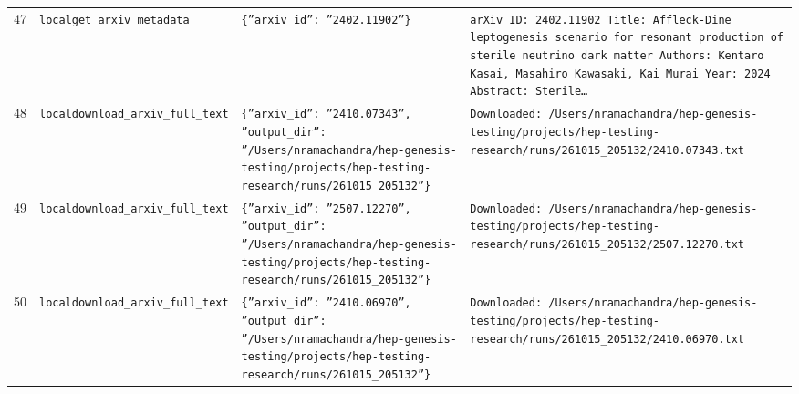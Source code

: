 \documentclass[11pt,a4paper]{article}
\begin{document}
\begin{longtable}{@{}p{}p{}p{}p{}@{}}
47 & \texttt{local}\newline\texttt{get\_\allowbreak{}arxiv\_\allowbreak{}metadata} & \texttt{\{''arxiv\_\allowbreak{}id'':\allowbreak{} ''2402.11902''\}\allowbreak{}} & \texttt{arXiv ID:\allowbreak{} 2402.11902 Title:\allowbreak{} Affleck-Dine leptogenesis scenario for resonant production of sterile neutrino dark matter Authors:\allowbreak{} Kentaro Kasai,\allowbreak{} Masahiro Kawasaki,\allowbreak{} Kai Murai Year:\allowbreak{} 2024 Abstract:\allowbreak{} Sterile\ldots{}\allowbreak{}} \\
48 & \texttt{local}\newline\texttt{download\_\allowbreak{}arxiv\_\allowbreak{}full\_\allowbreak{}text} & \texttt{\{''arxiv\_\allowbreak{}id'':\allowbreak{} ''2410.07343'',\allowbreak{} ''output\_\allowbreak{}dir'':\allowbreak{} ''/\allowbreak{}Users/\allowbreak{}nramachandra/\allowbreak{}hep-genesis-testing/\allowbreak{}projects/\allowbreak{}hep-testing-research/\allowbreak{}runs/\allowbreak{}261015\_\allowbreak{}205132''\}\allowbreak{}} & \texttt{Downloaded:\allowbreak{} /\allowbreak{}Users/\allowbreak{}nramachandra/\allowbreak{}hep-genesis-testing/\allowbreak{}projects/\allowbreak{}hep-testing-research/\allowbreak{}runs/\allowbreak{}261015\_\allowbreak{}205132/\allowbreak{}2410.07343.txt} \\
49 & \texttt{local}\newline\texttt{download\_\allowbreak{}arxiv\_\allowbreak{}full\_\allowbreak{}text} & \texttt{\{''arxiv\_\allowbreak{}id'':\allowbreak{} ''2507.12270'',\allowbreak{} ''output\_\allowbreak{}dir'':\allowbreak{} ''/\allowbreak{}Users/\allowbreak{}nramachandra/\allowbreak{}hep-genesis-testing/\allowbreak{}projects/\allowbreak{}hep-testing-research/\allowbreak{}runs/\allowbreak{}261015\_\allowbreak{}205132''\}\allowbreak{}} & \texttt{Downloaded:\allowbreak{} /\allowbreak{}Users/\allowbreak{}nramachandra/\allowbreak{}hep-genesis-testing/\allowbreak{}projects/\allowbreak{}hep-testing-research/\allowbreak{}runs/\allowbreak{}261015\_\allowbreak{}205132/\allowbreak{}2507.12270.txt} \\
50 & \texttt{local}\newline\texttt{download\_\allowbreak{}arxiv\_\allowbreak{}full\_\allowbreak{}text} & \texttt{\{''arxiv\_\allowbreak{}id'':\allowbreak{} ''2410.06970'',\allowbreak{} ''output\_\allowbreak{}dir'':\allowbreak{} ''/\allowbreak{}Users/\allowbreak{}nramachandra/\allowbreak{}hep-genesis-testing/\allowbreak{}projects/\allowbreak{}hep-testing-research/\allowbreak{}runs/\allowbreak{}261015\_\allowbreak{}205132''\}\allowbreak{}} & \texttt{Downloaded:\allowbreak{} /\allowbreak{}Users/\allowbreak{}nramachandra/\allowbreak{}hep-genesis-testing/\allowbreak{}projects/\allowbreak{}hep-testing-research/\allowbreak{}runs/\allowbreak{}261015\_\allowbreak{}205132/\allowbreak{}2410.06970.txt} \\

\end{longtable}
\end{document}
